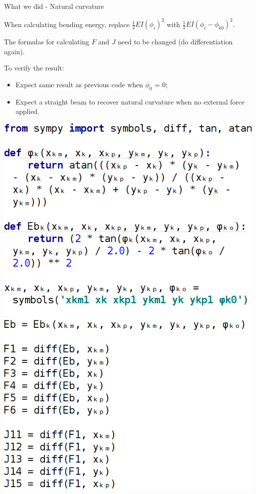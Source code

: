 \documentclass{beamer}
\newlength{\currentparskip}
\newenvironment{minipageparskip}[1]{\setlength{\currentparskip}{\parskip}\begin{minipage}{#1}\setlength{\parskip}{\currentparskip}}{\end{minipage}}
\begin{document}
	\begin{frame}{What we did - Natural curvature}
		\begin{minipageparskip}{0.5\textwidth}
			When calculating bending energy, replace $\frac12EI(\phi_i)^2$ with $\frac12EI(\phi_i - \phi_{k0})^2$.
			
			The formulas for calculating $F$ and $J$ need to be changed (do differentiation again).
			
			\footnotesize
			To verify the result:
			\begin{itemize}
				\item Expect same result as previous code when $\phi_0$ = 0;
				\item Expect a straight beam to recover natural curvature when no external force applied.
			\end{itemize}
		\end{minipageparskip}%
		\hspace{0.05\textwidth}%
		\begin{minipageparskip}{0.45\textwidth}
			\includegraphics[width=\textwidth]{res/diff.png}
		\end{minipageparskip}
	\end{frame}
\end{document}
